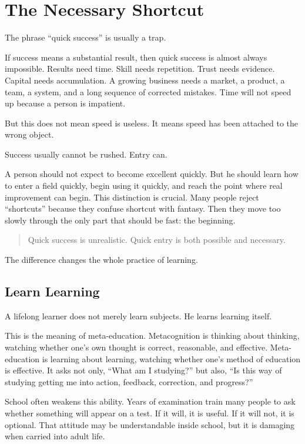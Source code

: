 \chapter{The Necessary Shortcut}

The phrase ``quick success'' is usually a trap.

If success means a substantial result, then quick success is almost always impossible. Results need time. Skill needs repetition. Trust needs evidence. Capital needs accumulation. A growing business needs a market, a product, a team, a system, and a long sequence of corrected mistakes. Time will not speed up because a person is impatient.

But this does not mean speed is useless. It means speed has been attached to the wrong object.

Success usually cannot be rushed. Entry can.

A person should not expect to become excellent quickly. But he should learn how to enter a field quickly, begin using it quickly, and reach the point where real improvement can begin. This distinction is crucial. Many people reject ``shortcuts'' because they confuse shortcut with fantasy. Then they move too slowly through the only part that should be fast: the beginning.

\begin{quote}
Quick success is unrealistic. Quick entry is both possible and necessary.
\end{quote}

The difference changes the whole practice of learning.

\section*{Learn Learning}

A lifelong learner does not merely learn subjects. He learns learning itself.

This is the meaning of meta-education. Metacognition is thinking about thinking, watching whether one's own thought is correct, reasonable, and effective. Meta-education is learning about learning, watching whether one's method of education is effective. It asks not only, ``What am I studying?'' but also, ``Is this way of studying getting me into action, feedback, correction, and progress?''

School often weakens this ability. Years of examination train many people to ask whether something will appear on a test. If it will, it is useful. If it will not, it is optional. That attitude may be understandable inside school, but it is damaging when carried into adult life.


